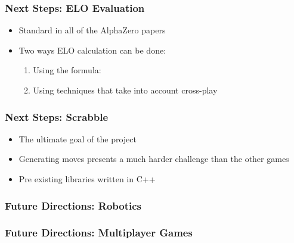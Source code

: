 \documentclass{beamer}
\begin{document}


\begin{frame}
  \frametitle{Next Steps: ELO Evaluation}

  \begin{itemize}
    \item Standard in all of the AlphaZero papers
    \item Two ways ELO calculation can be done:
      \begin{enumerate}
        \item{Using the formula: }
        \item{Using techniques that take into account cross-play}
      \end{enumerate}
  \end{itemize}
\end{frame}



\begin{frame}
  \frametitle{Next Steps: Scrabble}

  \begin{itemize}
    \item The ultimate goal of the project
    \item Generating moves presents a much harder challenge than the other games
    \item Pre existing libraries written in C++
  \end{itemize}
\end{frame}



\begin{frame}
  \frametitle{Future Directions: Robotics}
\end{frame}



\begin{frame}
  \frametitle{Future Directions: Multiplayer Games}
\end{frame}

\end{document}
